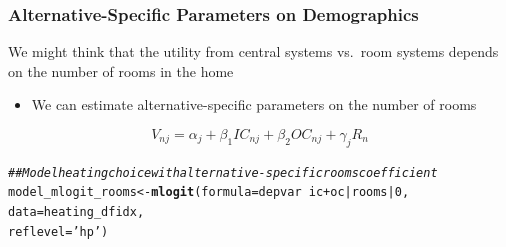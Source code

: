 \documentclass{beamer}\usepackage[]{graphicx}\usepackage[]{xcolor}
\makeatletter
\newcommand{\hlnum}[1]{\textcolor[rgb]{0.686,0.059,0.569}{#1}}%
\newcommand{\hlstr}[1]{\textcolor[rgb]{0.192,0.494,0.8}{#1}}%
\newcommand{\hlcom}[1]{\textcolor[rgb]{0.678,0.584,0.686}{\textit{#1}}}%
\newcommand{\hlopt}[1]{\textcolor[rgb]{0,0,0}{#1}}%
\newcommand{\hlstd}[1]{\textcolor[rgb]{0.345,0.345,0.345}{#1}}%
\newcommand{\hlkwb}[1]{\textcolor[rgb]{0.69,0.353,0.396}{#1}}%
\newcommand{\hlkwc}[1]{\textcolor[rgb]{0.333,0.667,0.333}{#1}}%
\newcommand{\hlkwd}[1]{\textcolor[rgb]{0.737,0.353,0.396}{\textbf{#1}}}%
\newenvironment{kframe}{%
 \def\at@end@of@kframe{}%
 \ifinner\ifhmode%
  \def\at@end@of@kframe{\end{minipage}}%
  \begin{minipage}{\columnwidth}%
 \fi\fi%
 \def\FrameCommand##1{\hskip\@totalleftmargin \hskip-\fboxsep
 \colorbox{shadecolor}{##1}\hskip-\fboxsep
     \hskip-\linewidth \hskip-\@totalleftmargin \hskip\columnwidth}%
 \MakeFramed {\advance\hsize-\width
   \@totalleftmargin\z@ \linewidth\hsize
   \@setminipage}}%
 {\par\unskip\endMakeFramed%
 \at@end@of@kframe}
\newenvironment{knitrout}{}{} %
\makeatother
\begin{document}
\begin{frame}[fragile]\frametitle{Alternative-Specific Parameters on Demographics}
	We might think that the utility from central systems vs.\ room systems depends on the number of rooms in the home
	\begin{itemize}
		\item We can estimate alternative-specific parameters on the number of rooms
	\end{itemize}
	$$V_{nj} = \alpha_j + \beta_1 IC_{nj} + \beta_2 OC_{nj} + \gamma_j R_{n}$$
\begin{knitrout}\footnotesize
{}\color{fgcolor}\begin{kframe}
\begin{alltt}
\hlcom{## Model heating choice with alternative-specific rooms coefficient}
\hlstd{model_mlogit_rooms} \hlkwb{<-} \hlkwd{mlogit}\hlstd{(}\hlkwc{formula} \hlstd{= depvar} \hlopt{~} \hlstd{ic} \hlopt{+} \hlstd{oc} \hlopt{|} \hlstd{rooms} \hlopt{|} \hlnum{0}\hlstd{,}
                             \hlkwc{data} \hlstd{= heating_dfidx,}
                             \hlkwc{reflevel} \hlstd{=} \hlstr{'hp'}\hlstd{)}
\end{alltt}
\end{kframe}
\end{knitrout}
\end{frame}
\end{document}
